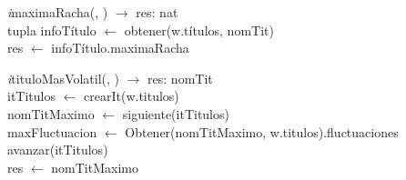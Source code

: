 \begin{Representacion}
\begin{Algoritmos}
\begin{algorithm}[H]
\textit{i}maximaRacha(, ) $\longrightarrow$ res: nat\\
\BlankLine
tupla infoTítulo $\leftarrow$ obtener(w.títulos, nomTit)\\
res $\leftarrow$ infoTítulo.maximaRacha\\
\end{algorithm}

\begin{algorithm}[H]
\textit{i}tituloMasVolatil(, ) $\longrightarrow$ res: nomTit\\
\BlankLine
itTitulos $\leftarrow$ crearIt(w.titulos)\\
nomTitMaximo $\leftarrow$ siguiente(itTitulos)\\
maxFluctuacion $\leftarrow$ Obtener(nomTitMaximo, w.titulos).fluctuaciones\\
avanzar(itTitulos)\\
res $\leftarrow$ nomTitMaximo\\
\end{algorithm}



\end{Algoritmos}
\end{Representacion}
